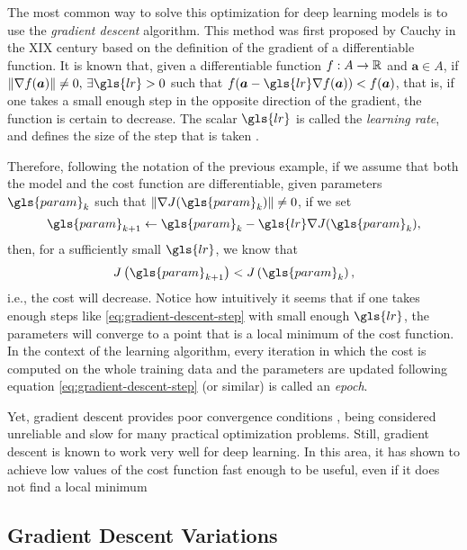 The most common way to solve this optimization for deep learning models is to use the \textit{gradient descent} algorithm.
This method was first proposed by Cauchy in the XIX century \cite{lemarechal_cauchy_2012} based on the definition of the gradient of a differentiable function.
It is known that, given a differentiable function $f:A\to\mathbb{R}$ and $\bm{a} \in A$, if $\| \nabla f(\bm{a}) \| \neq 0,\,\exists \gls{lr} > 0$ such that $f(\bm{a} - \gls{lr} \nabla f(\bm{a})) < f(\bm{a})$, that is, if one takes a small enough step in the opposite direction of the gradient, the function is certain to decrease.
The scalar $\gls{lr}$ is called the \textit{learning rate}, and defines the size of the step that is taken \cite{goodfellow_deep_2016}.

Therefore, following the notation of the previous example, if we assume that both the model and the cost function are differentiable, given parameters $\gls{param}_k$ such that $\| \nabla J(\gls{param}_k) \| \neq 0$, if we set
\begin{equation}\label{eq:gradient-descent-step}
\gls{param}_{k+1} \gets \gls{param}_k - \gls{lr} \nabla J(\gls{param}_k) 
,\end{equation}
then, for a sufficiently small $\gls{lr}$, we know that \[
J\left( \gls{param}_{k+1} \right) < J\left( \gls{param}_k \right) 
,\] i.e., the cost will decrease.
Notice how intuitively it seems that if one takes enough steps like \eqref{eq:gradient-descent-step} with small enough $\gls{lr}$, the parameters will converge to a point that is a local minimum of the cost function.
In the context of the learning algorithm, every iteration in which the cost is computed on the whole training data and the parameters are updated following equation \eqref{eq:gradient-descent-step} (or similar) is called an \emph{epoch}.


Yet, gradient descent provides poor convergence conditions \cite{wolfe_convergence_1969}, being considered unreliable and slow for many practical optimization problems.
Still, gradient descent is known to work very well for deep learning.
In this area, it has shown to achieve low values of the cost function fast enough to be useful, even if it does not find a local minimum \cite{goodfellow_deep_2016}

\subsection{Gradient Descent Variations}

